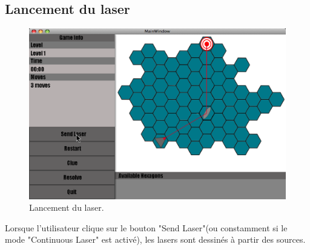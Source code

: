 \documentclass[]{article}
\begin{document}
\subsection{Lancement du laser }\label{sec:game5}
\begin{figure}[!htb]
\begin{center}
  \includegraphics[width=\textwidth]{Game5.png}
  \caption{Lancement du laser.}\label{fig:game5}
\end{center}
\end{figure}
Lorsque l'utilisateur clique sur le bouton "Send Laser"(ou constamment si le mode "Continuous Laser" est activé), les lasers sont dessinés à partir des sources.
\newpage
\end{document}
